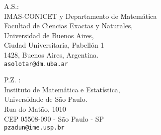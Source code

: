 \documentclass[11pt,fleqn]{article}
\begin{document}
\begin{bibdiv}
\begin{biblist}
\end{biblist}
\end{bibdiv}

\vspace{5em}

\noindent A.S.: \\
IMAS-CONICET y Departamento de Matem\'atica\\
Facultad de Ciencias  Exactas y Naturales,\\
Universidad de Buenos Aires,\\
Ciudad Universitaria, Pabell\'on 1\\
1428, Buenos Aires, Argentina.\\
\texttt{asolotar@dm.uba.ar}

\bigskip

\noindent P.Z. :\\
Instituto de Matem\'atica e Estat\'istica, \\
Universidade de S\~ao Paulo. \\
Rua do Matão, 1010 \\
CEP 05508-090 - S\~ao Paulo - SP\\
\texttt{pzadun@ime.usp.br}
\end{document}
